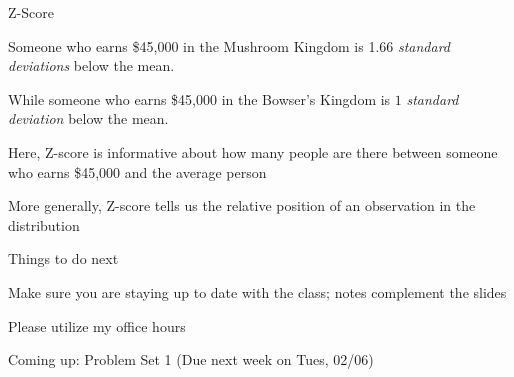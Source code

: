 \documentclass{./../div_teaching_slides}
\begin{document}
\begin{frame}{Z-Score}
\begin{witemize}
\item Someone who earns \$45,000 in the Mushroom Kingdom is 1.66 \textit{standard deviations} below the mean.
\item While someone who earns \$45,000 in the  Bowser's Kingdom is $1$ \textit{standard deviation} below the mean.
  \item Here, Z-score is informative about how many people are there between someone who earns \$45,000 and the average person 
  \item More generally, Z-score tells us the relative position of an observation in the distribution
\end{witemize}
\end{frame}

\begin{frame}{Things to do next}
\begin{witemize}
\item Make sure you are staying up to date with the class; notes complement the slides
\item Please utilize my office hours
\item Coming up: Problem Set 1 (Due next week on Tues, 02/06)
\end{witemize}
\end{frame}
\end{document}
